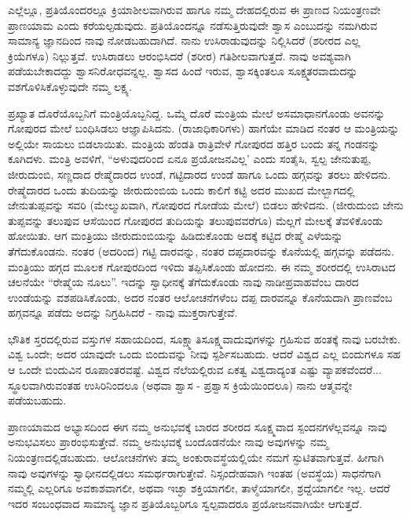 ಎಲ್ಲೆಲ್ಲೂ, ಪ್ರತಿಯೊಂದರಲ್ಲೂ ಕ್ರಿಯಾಶೀಲವಾಗಿರುವ ಹಾಗೂ ನಮ್ಮ ದೇಹದಲ್ಲಿರುವ ಈ ಪ್ರಾಣದ ನಿಯಂತ್ರಣವೇ ಪ್ರಾಣಯಾಮ ಎಂದು ಕರೆಯಲ್ಪಡುವುದು. ಪ್ರತಿಯೊಂದನ್ನೂ ನಡೆಸುತ್ತಿರುವುದೇ ಶ್ವಾಸ ಎಂಬುದನ್ನು ನಮಗಿರುವ ಸಾಮಾನ್ಯ ಜ್ಞಾನದಿಂದ ನಾವು ನೋಡಬಹುದಾಗಿದೆ. ನಾನು ಉಸಿರಾಡುವುದನ್ನು ನಿಲ್ಲಿಸಿದರೆ (ಶರೀರದ ಎಲ್ಲ ಕ್ರಿಯೆಗಳೂ) ನಿಲ್ಲುತ್ತವೆ. ಉಸಿರಾಡಲು ಆರಂಭಿಸಿದರೆ (ಶರೀರ) ಗತಿಶೀಲವಾಗುತ್ತದೆ. ನಾವು ಅವಶ್ಯವಾಗಿ ಪಡೆಯಬೇಕಾದದ್ದು ಶ್ವಾಸನಿರೋಧವನ್ನಲ್ಲ. ಶ್ವಾಸದ ಹಿಂದೆ ಇರುವ, ಶ್ವಾಸಕ್ಕಿಂತಲೂ ಸೂಕ್ಷ್ಮತರವಾದುದನ್ನು ವಶಗೊಳಿಸಿಕೊಳ್ಳುವುದೇ ನಮ್ಮ ಲಕ್ಷ್ಯ.

ಪ್ರಖ್ಯಾತ ದೊರೆಯೊಬ್ಬನಿಗೆ ಮಂತ್ರಿಯೊಬ್ಬನಿದ್ದ. ಒಮ್ಮೆ ದೊರೆ ಮಂತ್ರಿಯ ಮೇಲೆ ಅಸಮಾಧಾನಗೊಂಡು ಅವನನ್ನು ಗೋಪುರದ ಮೇಲೆ ಬಂಧಿಸಿಡಲು ಆಜ್ಞಾಪಿಸಿದನು. (ರಾಜಾಧಿಕಾರಿಗಳು) ಹಾಗೆಯೇ ಮಾಡಿದ ನಂತರ ಆ ಮಂತ್ರಿಯನ್ನು ಅಲ್ಲಿಯೇ ಸಾಯಲು ಬಿಡಲಾಯಿತು. ಮಂತ್ರಿಯ ಹೆಂಡತಿ ರಾತ್ರಿವೇಳೆ ಗೋಪುರದ ಹತ್ತಿರ ಬಂದು ತನ್ನ ಗಂಡನನ್ನು ಕೂಗಿದಳು. ಮಂತ್ರಿ ಅವಳಿಗೆ, “ಅಳುವುದರಿಂದ ಏನೂ ಪ್ರಯೋಜನವಿಲ್ಲ' ಎಂದು ಸಂತೈಸಿ, ಸ್ವಲ್ಪ ಜೇನುತುಪ್ಪ, ಜೀರುದುಂಬಿ, ಸಣ್ಣದಾದ ರೇಷ್ಮೆದಾರದ ಉಂಡೆ, ಗಟ್ಟಿದಾರದ ಉಂಡೆ ಹಾಗೂ ಒಂದು ಹಗ್ಗವನ್ನು ತರಲು ಹೇಳಿದನು. ರೇಷ್ಮೆದಾರದ ಒಂದು ತುದಿಯನ್ನು ಜೀರುದುಂಬಿಯ ಒಂದು ಕಾಲಿಗೆ ಕಟ್ಟಿ ಅದರ ಮುಖದ ಮೇಲ್ಬಾಗದಲ್ಲಿ ಜೇನುತುಪ್ಪವನ್ನು ಸವರಿ (ಮೇಲ್ಮುಖವಾಗಿ, ಗೋಪುರದ ಗೋಡೆಯ ಮೇಲೆ) ಬಿಡಲು ಹೇಳಿದನು. (ಜೀರುದುಂಬಿ ಜೇನು ತುಪ್ಪವನ್ನು ತಲುಪುವ ಆಸೆಯಿಂದ ಗೋಪುರದ ತುದಿಯನ್ನು ತಲುಪುವವರೆಗೂ) ಮೆಲ್ಲಗೆ ಮೇಲಕ್ಕೆ ತೆವಳಿಕೊಂಡು ಹೋಯಿತು. ಆಗ ಮಂತ್ರಿಯು ಜೀರುದುಂಬಿಯನ್ನು ಹಿಡಿದುಕೊಂಡು ಅದಕ್ಕೆ ಕಟ್ಟಿದ ರೇಷ್ಮೆ ಎಳೆಯನ್ನು ತೆಗೆದುಕೊಂಡನು. ನಂತರ (ಅದರಿಂದ) ಗಟ್ಟಿ ದಾರವನ್ನು, ನಂತರ ದಪ್ಪದಾರವನ್ನು ಕೊನೆಯಲ್ಲಿ ಹಗ್ಗವನ್ನು ಪಡೆದನು. ಮಂತ್ರಿಯು ಹಗ್ಗದ ಮೂಲಕ ಗೋಪುರದಿಂದ ಇಳಿದು ತಪ್ಪಿಸಿಕೊಂಡು ಹೋದನು. ಈ ನಮ್ಮ ಶರೀರದಲ್ಲಿ ಉಸಿರಾಟದ ಚಲನೆಯೇ “ರೇಷ್ಮೆಯ ನೂಲು”. ಇದನ್ನು ಸ್ವಾಧೀನಕ್ಕೆ ತೆಗೆದುಕೊಂಡು ನಾವು ನಾಡೀಪ್ರವಾಹವೆಂಬ ದಾರದ ಉಂಡೆಯನ್ನು ವಶಪಡಿಸಿಕೊಂಡು, ಅದರ ನಂತರ ಆಲೋಚನೆಗಳೆಂಬ ದಪ್ಪ ದಾರವನ್ನೂ ಕೊನೆಯದಾಗಿ ಪ್ರಾಣವೆಂಬ ಹಗ್ಗವನ್ನೂ ಪಡೆದು ಅದನ್ನು ನಿಗ್ರಹಿಸಿದರೆ - ನಾವು ಮುಕ್ತರಾಗುತ್ತೇವೆ.

ಭೌತಿಕ ಸ್ತರದಲ್ಲಿರುವ ವಸ್ತುಗಳ ಸಹಾಯದಿಂದ, ಸೂಕ್ಷ್ಮಾತಿಸೂಕ್ಷ್ಮವಾದುವುಗಳನ್ನು ಗ್ರಹಿಸುವ ಹಂತಕ್ಕೆ ನಾವು ಬರಬೇಕು. ವಿಶ್ವ ಒಂದೇ; ಅದರ ಯಾವುದೇ ಒಂದು ಬಿಂದುವನ್ನು ನೀವು ಸ್ಪರ್ಶಿಸಬಹುದು. ಆದರೆ ವಿಶ್ವದ ಎಲ್ಲ ಬಿಂದುಗಳೂ ಸಹ ಆ ಒಂದೇ ಬಿಂದುವಿನ ರೂಪಾಂತರವಷ್ಟೆ. ವಿಶ್ವದ ನೆಲೆಯಲ್ಲಿರುವ ಏಕತ್ವ ವಿಶ್ವದಾದ್ಯಂತ ಎಷ್ಟು ವ್ಯಾಪಕವೆಂದರೆ... ಸ್ಥೂಲವಾಗಿರುವಂತಹ ಉಸಿರಿನಿಂದಲೂ (ಅಥವಾ ಶ್ವಾಸ - ಪ್ರಶ್ವಾಸ ಕ್ರಿಯೆಯಿಂದಲೂ) ನಾನು ಆತ್ಮವನ್ನೇ ಪಡೆಯಬಹುದು.

ಪ್ರಾಣಯಾಮದ ಅಭ್ಯಾಸದಿಂದ ಈಗ ನಮ್ಮ ಅನುಭವಕ್ಕೆ ಬಾರದ ಶರೀರದ ಸೂಕ್ಷ್ಮವಾದ ಸ್ಪಂದನಗಳೆಲ್ಲವನ್ನೂ ನಾವು ಅನುಭವಿಸಲು ಪ್ರಾರಂಭಿಸುತ್ತೇವೆ. ನಮ್ಮ ಅನುಭವಕ್ಕೆ ಬಂದೊಡನೆಯೇ ನಾವು ಅವುಗಳನ್ನು ನಮ್ಮ ನಿಯಂತ್ರಣದಲ್ಲಿಡಬಹುದು. ಆಲೋಚನೆಗಳು ತಮ್ಮ ಅಂಕುರಾವಸ್ಥೆಯಲ್ಲಿಯೇ ನಮಗೆ ಸ್ಫುಟಿತವಾಗುತ್ತವೆ. ಹೀಗಾಗಿ ನಾವು ಅವುಗಳನ್ನು ಸ್ವಾಧೀನದಲ್ಲಿಡಲು ಸಮರ್ಥರಾಗುತ್ತೇವೆ. ನಿಸ್ಸಂದೇಹವಾಗಿ ಇಂತಹ (ಅವಸ್ಥೆಯ) ಸಾಧನೆಗಾಗಿ ನಮ್ಮಲ್ಲಿ ಎಲ್ಲರಿಗೂ ಅವಕಾಶವಾಗಲೀ, ಅಥವಾ ಇಚ್ಛಾ ಶಕ್ತಿಯಾಗಲೀ, ತಾಳ್ಮೆಯಾಗಲೀ, ಶ್ರದ್ದೆಯಾಗಲೀ ಇಲ್ಲ. ಆದರೆ ಇದರ ಸಂಬಂಧವಾದ ಸಾಮಾನ್ಯ ಜ್ಞಾನ ಪ್ರತಿಯೊಬ್ಬರಿಗೂ ಸ್ವಲ್ಪವಾದರೂ ಪ್ರಯೋಜನವಾಗಿಯೇ ಆಗುತ್ತದೆ.

